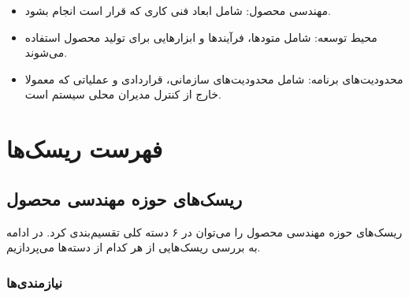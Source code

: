 \begin{itemize}
	\item
	 مهندسی محصول: شامل ابعاد فنی کاری که قرار است انجام بشود.
	
	\item
	 محیط توسعه: شامل متودها، فرآیندها و ابزارهایی برای تولید محصول استفاده می‌شوند.
	
	\item
	 محدودیت‌های برنامه: شامل محدودیت‌های سازمانی، قراردادی و عملیاتی که معمولا خارج از کنترل مدیران محلی سیستم است.
\end{itemize}

\section{فهرست ریسک‌ها}

\subsection{ریسک‌های حوزه مهندسی محصول}

ریسک‌های حوزه مهندسی محصول را می‌توان در ۶ دسته کلی تقسیم‌بندی کرد. در ادامه به بررسی ریسک‌هایی از هر کدام از دسته‌ها می‌پردازیم.


\subsubsection{نیازمندی‌ها}

